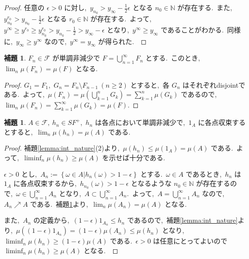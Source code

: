 \documentclass[a4j,11pt]{jarticle}
\theoremstyle{definition}
\newtheorem{lemma}[theorem]{補題}
\begin{document}
\begin{proof}
  任意の
  $\epsilon > 0$
  に対し,\ 
  $y_{n_0} > y_\infty - \frac{1}{2}\epsilon$
  となる
  $n_0 \in \mathbb{N}$
  が存在する.\ 
  また,\ 
  $y_{n_0}^{r_0} > y_{n_0} - \frac{1}{2}\epsilon$
  となる
  $r_0 \in \mathbb{N}$
  が存在する.\ 
  よって,\ 
  $y^{\infty} \geq y^{r_0} \geq y_{n_0}^{r_0} > y_{n_0} - \frac{1}{2} > y_{\infty} - \epsilon$
  となり,\ 
  $y^{\infty} \geq y_{\infty}$
  であることがわかる.\ 
  同様に,\ 
  $y_{\infty} \geq y^{\infty}$
  なので,\ 
  $y^{\infty} = y_{\infty}$
  が得られた.\ 
\end{proof}


\begin{lemma} \label{lemma:mono_set}
  $F_n \in \mathcal{F}$
  が単調非減少で
  $F=\bigcup_{n=1}^{\infty} F_n$
  とする.\ 
  このとき,\ 
  $\lim_{n} \mu(F_n) = \mu(F)$
  となる.\ 
\end{lemma}


\begin{proof}
  $G_1 = F_1$,\ 
  $G_n = F_n \setminus F_{n-1}\ (n\geq2)$
  とすると,\ 各
  $G_n$
  はそれぞれdisjointである.\ 
  よって,\ 
  $\mu(F_n) = \mu(\bigcup_{k=1}^n G_k) = \sum_{k=1}^n \mu(G_k)$
  であるので,\ 
  $\lim_{n} \mu(F_n) = \sum_{k=1}^{\infty} \mu(G_k) = \mu(F)$.
\end{proof}

\begin{lemma}
  $A \in \mathcal{F},\ h_n \in SF^+$,\ 
  $h_n$
  は各点において単調非減少で,\ 
  $1_A$
  に各点収束するとすると,\ 
  $\lim_n \mu(h_n) = \mu(A)$
  である.\ 
\end{lemma}

\begin{proof}
  補題\ref{lemma:int_nature}(2)より,\ 
  $\mu(h_n) \leq \mu(1_A) = \mu(A)$
  である.\ 
  よって,\ 
  $\liminf_{n} \mu(h_n) \geq \mu(A)$
  を示せば十分である.\ 

  $\epsilon > 0$
  とし,\ 
  $A_n := \left\{\omega \in A | h_n(\omega) > 1-\epsilon \right\}$
  とする.\ 
  $\omega \in A$
  であるとき,\ 
  $h_n$
  は
  $1_{A}$
  に各点収束するから,\ 
  $h_{n_0}(\omega) > 1 - \epsilon$
  となるような
  $n_0 \in \mathbb{N}$
  が存在するので,\ 
  $\omega \in \bigcup_{n=1}^{\infty} A_n$
  となり,\ 
  $A \subset \bigcup_{n=1}^{\infty} A_n$.\ 
  よって,\ 
  $A = \bigcup_{n=1}^{\infty} A_n$
  なので,\ 
  $A_n \nearrow A$
  である.\ 
  補題\ref{lemma:mono_set}より,\ 
  $\lim_n \mu(A_n) = \mu(A)$
  となる.\ 

  また,\ 
  $A_n$
  の定義から,\ 
  $(1-\epsilon)1_{A_n} \leq h_n$
  であるので,\ 補題\ref{lemma:int_nature}より,\ 
  $\mu((1-\epsilon)1_{A_n}) = (1-\epsilon)\mu(A_n) \leq \mu(h_n)$
  となり,\ 
  $\liminf_n \mu(h_n) \geq (1-\epsilon) \mu(A)$
  である.\ 
  $\epsilon>0$
  は任意にとってよいので
  $\liminf_n \mu(h_n) \geq \mu(A)$
  となる.\ 
\end{proof}

%
%
\end{document}
